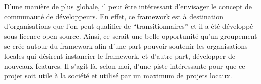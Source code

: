 D'une manière de plus globale,  il peut être intéressant d'envisager le concept de communauté de développeurs.  En effet,  ce framework est à destination d'organisations que l'on peut qualifier de ``transitionnaires'' et il a été développé sous licence open-source.  Ainsi,  ce serait une belle opportunité qu'un groupement se crée autour du framework afin d'une part pouvoir soutenir les organisations locales qui désirent instancier le framework,  et d'autre part,  développer de nouveaux features.  Il s'agit là,  selon moi,  d'une piste intéressante pour que ce projet soit utile à la société et utilisé par un maximum de projets locaux.  

